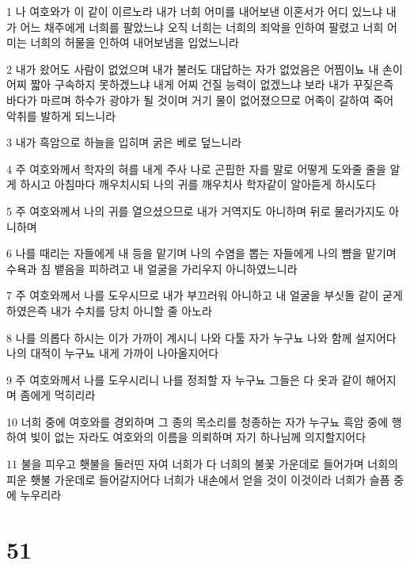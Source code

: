 \par 1 나 여호와가 이 같이 이르노라 내가 너희 어미를 내어보낸 이혼서가 어디 있느냐 내가 어느 채주에게 너희를 팔았느냐 오직 너희는 너희의 죄악을 인하여 팔렸고 너희 어미는 너희의 허물을 인하여 내어보냄을 입었느니라
\par 2 내가 왔어도 사람이 없었으며 내가 불러도 대답하는 자가 없었음은 어찜이뇨 내 손이 어찌 짧아 구속하지 못하겠느냐 내게 어찌 건질 능력이 없겠느냐 보라 내가 꾸짖은즉 바다가 마르며 하수가 광야가 될 것이며 거기 물이 없어졌으므로 어족이 갈하여 죽어 악취를 발하게 되느니라
\par 3 내가 흑암으로 하늘을 입히며 굵은 베로 덮느니라
\par 4 주 여호와께서 학자의 혀를 내게 주사 나로 곤핍한 자를 말로 어떻게 도와줄 줄을 알게 하시고 아침마다 깨우치시되 나의 귀를 깨우치사 학자같이 알아듣게 하시도다
\par 5 주 여호와께서 나의 귀를 열으셨으므로 내가 거역지도 아니하며 뒤로 물러가지도 아니하며
\par 6 나를 때리는 자들에게 내 등을 맡기며 나의 수염을 뽑는 자들에게 나의 뺨을 맡기며 수욕과 침 뱉음을 피하려고 내 얼굴을 가리우지 아니하였느니라
\par 7 주 여호와께서 나를 도우시므로 내가 부끄러워 아니하고 내 얼굴을 부싯돌 같이 굳게 하였은즉 내가 수치를 당치 아니할 줄 아노라
\par 8 나를 의롭다 하시는 이가 가까이 계시니 나와 다툴 자가 누구뇨 나와 함께 설지어다 나의 대적이 누구뇨 내게 가까이 나아올지어다
\par 9 주 여호와께서 나를 도우시리니 나를 정죄할 자 누구뇨 그들은 다 옷과 같이 해어지며 좀에게 먹히리라
\par 10 너희 중에 여호와를 경외하며 그 종의 목소리를 청종하는 자가 누구뇨 흑암 중에 행하여 빛이 없는 자라도 여호와의 이름을 의뢰하며 자기 하나님께 의지할지어다
\par 11 불을 피우고 횃불을 둘러띤 자여 너희가 다 너희의 불꽃 가운데로 들어가며 너희의 피운 횃불 가운데로 들어갈지어다 너희가 내손에서 얻을 것이 이것이라 너희가 슬픔 중에 누우리라

\chapter{51}

